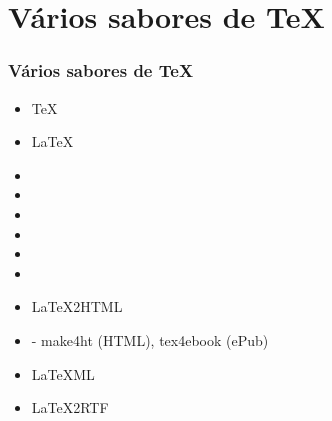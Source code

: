 \section{Vários sabores de \TeX{}}

\begin{frame}
\frametitle{Vários sabores de \TeX{}}
\begin{itemize}
\item \TeX{}
\item \LaTeX{}
\item {}
\item {}
\item {}
\item {}
\item {}
\item {}
\item LaTeX2HTML
\item {} - make4ht (HTML), tex4ebook (ePub)
\item LaTeXML
\item LaTeX2RTF
\end{itemize}
\end{frame}
